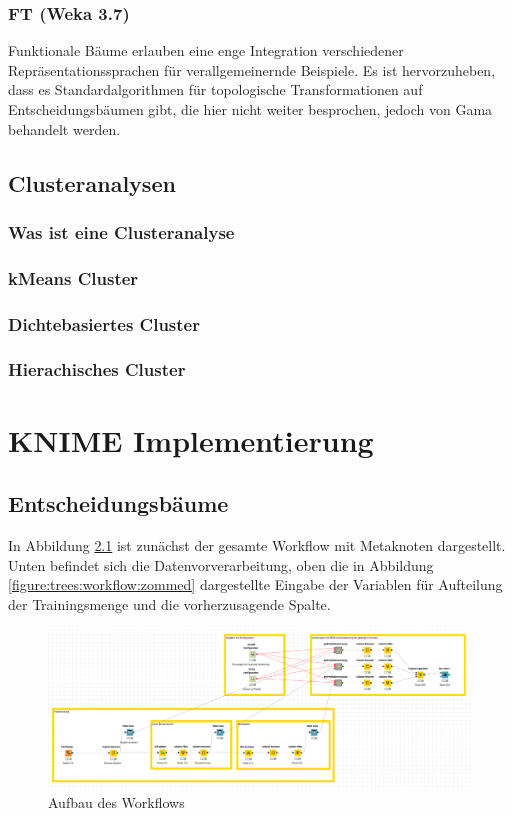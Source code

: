\documentclass[12pt,					%
							 oneside,			%
							 a4paper,			%
							 halfparskip,		%
							 liststotoc,			%
							 bibtotoc,			%
							 fleqn,				%
							 pointlessnumbers]	%
							 {scrreprt}
\begin{document}
		\subsection{FT (Weka 3.7)}
			Funktionale Bäume erlauben eine enge Integration verschiedener Repräsentationssprachen für verallgemeinernde Beispiele. Es ist hervorzuheben, dass es Standardalgorithmen für topologische Transformationen auf Entscheidungsbäumen gibt, die hier nicht weiter besprochen, jedoch von Gama behandelt werden.\cite{Gama2004}
			

	\section{Clusteranalysen}
		\subsection{Was ist eine Clusteranalyse}

		\subsection{kMeans Cluster}
		\subsection{Dichtebasiertes Cluster}
		\subsection{Hierachisches Cluster}

\chapter{KNIME Implementierung}

	\section{Entscheidungsbäume}
		In Abbildung \ref{figure:trees:workflow} ist zunächst der gesamte Workflow mit Metaknoten dargestellt. Unten befindet sich die Datenvorverarbeitung, oben die in Abbildung \ref{figure:trees:workflow:zommed} dargestellte Eingabe der Variablen für Aufteilung der Trainingsmenge und die vorherzusagende Spalte.
				
		\begin{figure}[h]
			\begin{center}
				\includegraphics[scale=0.3]{pictures/trees-workflow-gesamt.png}
				\caption{Aufbau des Workflows}									
				\label{figure:trees:workflow}
			\end{center}
		\end{figure}
		
\end{document}
